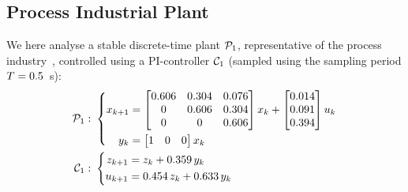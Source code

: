 \subsection{Process Industrial Plant}\label{sec:eval:stable}
We here analyse a stable discrete-time plant $\mathcal{P}_1$, representative of the process industry~\cite{Hagglund:2002}, controlled using a PI-controller $\mathcal{C}_1$ (sampled using the sampling period $T = 0.5$~s):
\begin{equation*}
    \begin{aligned}
        \mathcal{P}_1: \,\, &\left\{
        \begin{aligned}
            x_{k+1} &= \begin{bmatrix}
                0.606 & 0.304 & 0.076 \\
                0 & 0.606 & 0.304 \\
                0 & 0 & 0.606 \\
            \end{bmatrix} x_k + \begin{bmatrix}
                0.014 \\
                0.091 \\
                0.394 \\
            \end{bmatrix} u_k \\
            y_k &= \begin{bmatrix}
                1 & 0 & 0
            \end{bmatrix} x_k
        \end{aligned} \right. \\
        \mathcal{C}_1: \,\, &\left\{
        \begin{aligned}
            z_{k+1} &= z_k + 0.359\, y_k \\
            u_{k+1} &= 0.454\, z_k + 0.633\, y_k
        \end{aligned} \right.
    \end{aligned}
\end{equation*}

\afterpage{
    \clearpage
    \begin{landscape}
        
    \end{landscape}
    \clearpage
}
\afterpage{
    \clearpage
    \begin{landscape}
        
    \end{landscape}
    \clearpage
}

